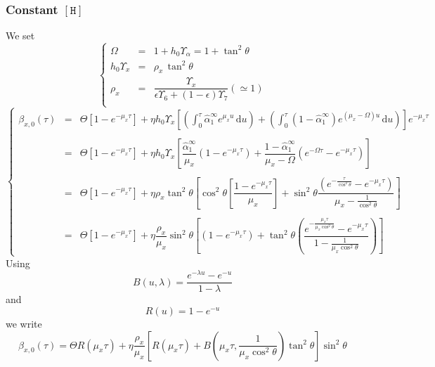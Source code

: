 \documentclass[aps,onecolumn,12pt]{revtex4}
\newcommand{\mychem}[1]{\mathtt{#1}}
\newcommand{\myconc}[1]{\left\lbrack{#1}\right\rbrack}
\newcommand{\spproton}{\mychem{H}}
\newcommand{\proton}{\myconc{\spproton}}
\begin{document}
\subsubsection{Constant $\proton$}
We set
\begin{equation}
\left\lbrace
\begin{array}{rcl}
	\Omega & = & 1 + h_0 \Upsilon_\alpha = 1 + \tan^2 \theta\\
	h_0 \Upsilon_x & = & \rho_x \, \tan^2\theta\\
	\rho_x & = & \dfrac{\Upsilon_x}{\epsilon\Upsilon_6+(1-\epsilon)\Upsilon_7} (\simeq 1) \\
\end{array}
\right.
\end{equation}
\begin{equation}
\left\lbrace
\begin{array}{rcl}
	\beta_{x,0}(\tau) & = & \displaystyle \Theta \left[ 1-e^{-\mu_x \tau}\right] + \eta h_0 \Upsilon_x
	\left[ 
	\left(
	\int_0^\tau 
	\hat\alpha_1^\infty e^{\mu_x u}
	\, \mathrm{d} u
	\right)
	+
	\left(
	\int_0^\tau \left(1-\hat\alpha_1^\infty\right) e^{(\mu_x-\Omega) u} \, \mathrm{d} u
	\right)
	\right] e^{-\mu_x \tau} \\
	\\
	& = & \displaystyle \Theta \left[ 1-e^{-\mu_x \tau}\right] + \eta h_0 \Upsilon_x \left[
	\dfrac{\hat\alpha_1^\infty}{\mu_x}\left(1-e^{-\mu_x \tau}\right)
	+\dfrac{1-\hat\alpha_1^\infty}{\mu_x-\Omega}\left(e^{-\Omega\tau}-e^{-\mu_x\tau}\right)
	\right]\\\\
	& = & \displaystyle \Theta \left[ 1-e^{-\mu_x \tau}\right] + \eta \rho_x \tan^2\theta \left[
	\cos^2\theta \left[\dfrac{1-e^{-\mu_x \tau}}{\mu_x}\right]
	+\sin^2\theta\dfrac{\left(e^{-\frac{\tau}{\cos^2\theta}}-e^{-\mu_x\tau}\right)}{\mu_x-\frac{1}{\cos^2\theta}}
	\right]\\
	\\
	& = & \displaystyle \Theta \left[ 1-e^{-\mu_x \tau}\right] + \eta \dfrac{\rho_x}{\mu_x} \sin^2\theta 
	\left[
	\left({1-e^{-\mu_x \tau}}\right) + \tan^2\theta
	\left(
	 \dfrac{e^{-\frac{\mu_x\tau}{\mu_x\cos^2\theta}}-e^{-\mu_x\tau}}{1-\frac{1}{\mu_x\cos^2\theta}}
	 \right)
	\right]
	\end{array}
\right.
\end{equation}
Using 
\begin{equation}
	B(u,\lambda) = \dfrac{e^{-\lambda u}-e^{-u}}{1-\lambda}
\end{equation}
and
\begin{equation}
	R(u) = 1-e^{-u}
\end{equation}
we write
\begin{equation}
		\beta_{x,0}(\tau) = \Theta R(\mu_x\tau) + \eta \dfrac{\rho_x}{\mu_x}  \left[ R(\mu_x\tau) +  B\left(\mu_x\tau,\frac{1}{\mu_x\cos^2\theta}\right)\tan^2\theta\right]\sin^2\theta
\end{equation}
\end{document}
